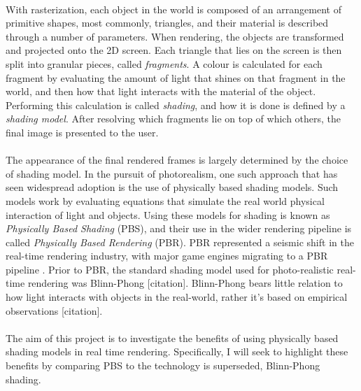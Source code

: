 \paragraph{}With rasterization, each object in the world is composed of an arrangement of primitive shapes, most commonly, triangles, and their material is described through a number of parameters. When rendering, the objects are transformed and projected onto the 2D screen. Each triangle that lies on the screen is then split into granular pieces, called \textit{fragments}. A colour is calculated for each fragment by evaluating the amount of light that shines on that fragment in the world, and then how that light interacts with the material of the object. Performing this calculation is called \textit{shading}, and how it is done is defined by a \textit{shading model}. After resolving which fragments lie on top of which others, the final image is presented to the user.

\paragraph{}The appearance of the final rendered frames is largely determined by the choice of shading model. In the pursuit of photorealism, one such approach that has seen widespread adoption is the use of physically based shading models. Such models work by evaluating equations that simulate the real world physical interaction of light and objects. Using these models for shading is known as \textit{Physically Based Shading} (PBS), and their use in the wider rendering pipeline is called \textit{Physically Based Rendering} (PBR). PBR represented a seismic shift in the real-time rendering industry, with major game engines migrating to a PBR pipeline \cite{movingFrostbitetoPBR} \cite{RealShadingInUnreal}. Prior to PBR, the standard shading model used for photo-realistic real-time rendering was Blinn-Phong [citation]. Blinn-Phong bears little relation to how light interacts with objects in the real-world, rather it’s based on empirical observations [citation].

\paragraph{}The aim of this project is to investigate the benefits of using physically based shading models in real time rendering. Specifically, I will seek to highlight these benefits by comparing PBS to the technology is superseded, Blinn-Phong shading.

